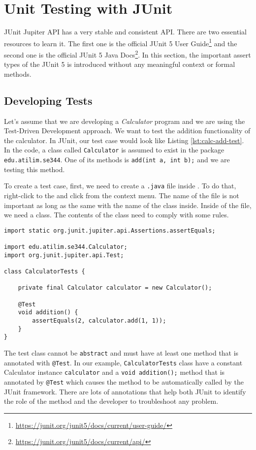 \chapter{Unit Testing with JUnit}
JUnit Jupiter API has a very stable and consistent API. There are two essential resources to learn it. The first one is the official JUnit 5 User Guide\footnote{\url{https://junit.org/junit5/docs/current/user-guide/}} and the second one is the official JUnit 5 Java Docs\footnote{\url{https://junit.org/junit5/docs/current/api/}}. In this section, the important assert types of the JUnit 5 is introduced without any meaningful context or formal methods.

\section{Developing Tests}
Let's assume that we are developing a \emph{Calculator} program and we are using the Test-Driven Development approach. We want to test the addition functionality of the calculator. In JUnit, our test case would look like Listing \ref{lst:calc-add-test}. In the code, a class called \verb|Calculator| is assumed to exist in the package \lstinline|edu.atilim.se344|. One of its methods is \lstinline!add(int a, int b);! and we are testing this method.

To create a test case, first, we need to create a \lstinline[language={}]|.java| file inside . To do that, right-click to the  and click  from the context menu. The name of the file is not important as long as the same with the name of the class inside. Inside of the file, we need a class. The contents of the class need to comply with some rules.

\begin{lstlisting}[caption={A test case for testing the addition functionality of the Calculator class.},label=lst:calc-add-test]
import static org.junit.jupiter.api.Assertions.assertEquals;

import edu.atilim.se344.Calculator;
import org.junit.jupiter.api.Test;

class CalculatorTests {

    private final Calculator calculator = new Calculator();

    @Test
    void addition() {
        assertEquals(2, calculator.add(1, 1));
    }
}
\end{lstlisting}

The test class cannot be \lstinline{abstract} and must have at least one method that is annotated with \lstinline!@Test!. In our example, \lstinline|CalculatorTests| class have a constant Calculator instance \lstinline|calculator| and a \lstinline!void addition();! method that is annotated by \lstinline!@Test! which causes the method to be automatically called by the JUnit framework. There are lots of annotations that help both JUnit to identify the role of the method and the developer to troubleshoot any problem.

